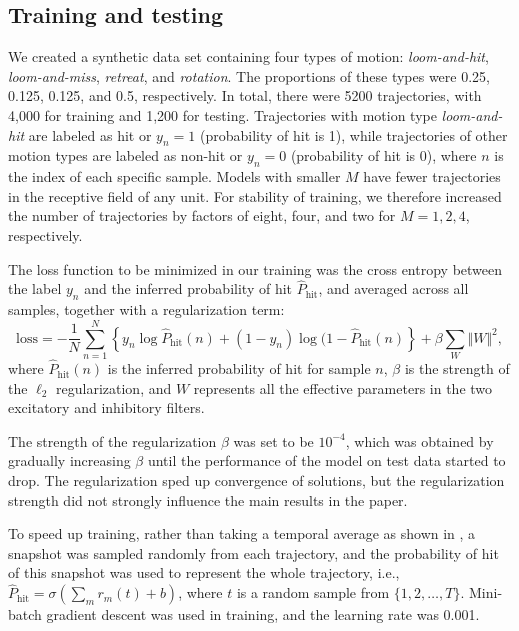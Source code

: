 \documentclass[pdftex,9pt,lineno]{elife}
\let\hat\widehat
\begin{document}
\subsection{Training and testing}
We created a synthetic data set containing four types of motion: \emph{loom-and-hit}, \emph{loom-and-miss}, \emph{retreat}, and \emph{rotation}. The proportions of these types were 0.25, 0.125, 0.125, and 0.5, respectively. In total, there were 5200 trajectories, with 4,000 for training and 1,200 for testing. Trajectories with motion type \emph{loom-and-hit} are labeled as hit or $y_{n}=1$ (probability of hit is 1), while trajectories of other motion types are labeled as non-hit or $y_{n}=0$ (probability of hit is 0), where $n$ is the index of each specific sample. Models with smaller $M$ have fewer trajectories in the receptive field of any unit. For stability of training, we therefore increased the number of trajectories by factors of eight, four, and two for $M=1, 2, 4$, respectively.

The loss function to be minimized in our training was the cross entropy between the label $y_{n}$ and the inferred probability of hit $\hat{P}_{\text{hit}}$, and averaged across all samples, together with a regularization term:
\begin{equation}
\text{loss}=-\frac{1}{N}\sum_{n=1}^{N}\left\{ y_{n}\log \hat{P}_{\text{hit}}(n)+(1-y_{n})\log (1-\hat{P}_{\text{hit}}(n) \right\}+\beta\sum_{W}\Vert W \Vert^{2},
\end{equation}
where $\hat{P}_{\text{hit}}(n)$ is the inferred probability of hit for sample $n$, $\beta$ is the strength of the $\ell_2$ regularization, and $W$ represents all the effective parameters in the two excitatory and inhibitory filters.

The strength of the regularization $\beta$ was set to be $10^{-4}$, which was obtained by gradually increasing $\beta$ until the performance of the model on test data started to drop. The regularization sped up convergence of solutions, but the regularization strength did not strongly influence the main results in the paper.

To speed up training, rather than taking a temporal average as shown in , a snapshot was sampled randomly from each trajectory, and the probability of hit of this snapshot was used to represent the whole trajectory, i.e., $\hat{P}_{\text{hit}}=\sigma \left( \sum_{m}r_{m}(t)+b \right)$, where $t$ is a random sample from $\{1,2,\dots,T\}$. Mini-batch gradient descent was used in training, and the learning rate was 0.001.
\end{document}
